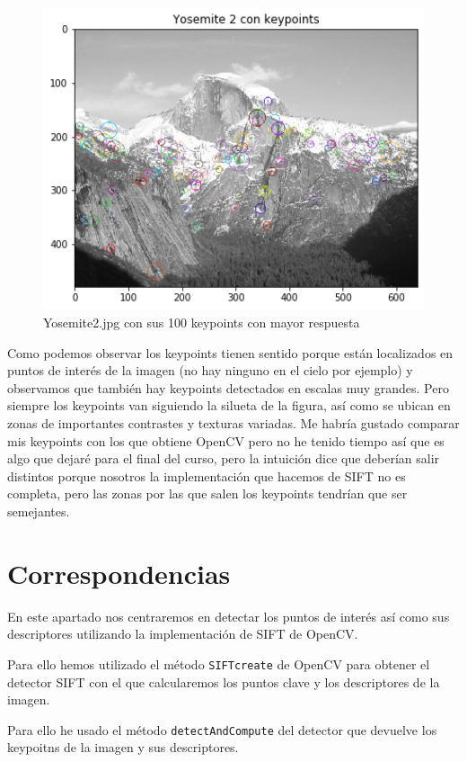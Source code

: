 \documentclass[12pt,spanish]{article}
\begin{document}
\begin{figure}[H]
	\centering
	\includegraphics[width=12cm]{./imagenes_memoria/kpyose2.png}
	\caption{Yosemite2.jpg con sus 100 keypoints con mayor respuesta}
	\label{kp_yose2}
\end{figure}

Como podemos observar los keypoints tienen sentido porque están localizados en puntos de interés de la imagen (no hay ninguno en el cielo por ejemplo) y observamos que también hay keypoints detectados en escalas muy grandes. Pero siempre los keypoints van siguiendo la silueta de la figura, así como se ubican en zonas de importantes contrastes y texturas variadas. Me habría gustado comparar mis keypoints
con los que obtiene OpenCV pero no he tenido tiempo así que es algo que dejaré para el final del curso, pero la intuición dice que deberían salir distintos porque nosotros la implementación que hacemos de SIFT no es completa, pero las zonas por las que salen los keypoints tendrían que ser semejantes.


\section{Correspondencias}
En este apartado nos centraremos en detectar los puntos de interés así como sus descriptores utilizando la implementación de SIFT de OpenCV.

Para ello hemos utilizado el método \texttt{SIFTcreate} de OpenCV para obtener el detector SIFT con el que calcularemos los puntos clave y los descriptores de la imagen.

Para ello he usado el método \texttt{detectAndCompute} del detector que devuelve los keypoitns de la imagen y sus descriptores. \\
\end{document}
